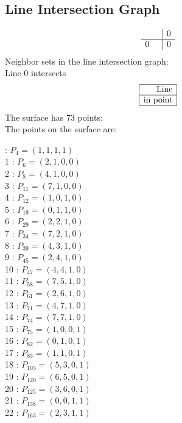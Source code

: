 \documentclass{article}
\begin{document}
{\subsection*{Line Intersection Graph}
{\arraycolsep=1pt
$$
\begin{array}{rr|*{1}r}
 &  & 0\\
\hline
0 &  & 0\\
\end{array}
$$
}%
Neighbor sets in the line intersection graph:\\
Line 0 intersects 
$$
\begin{array}{|r*{0}{|c}|}
\hline
\mbox{Line} \\
\hline
\mbox{in point} \\
\hline
\end{array}
$$
The surface has 73 points:\\
The points on the surface are:\\
\begin{multicols}{3}
 : $P_{4}=( 1, 1, 1, 1 )$\\
1 : $P_{6}=( 2, 1, 0, 0 )$\\
2 : $P_{8}=( 4, 1, 0, 0 )$\\
3 : $P_{11}=( 7, 1, 0, 0 )$\\
4 : $P_{12}=( 1, 0, 1, 0 )$\\
5 : $P_{19}=( 0, 1, 1, 0 )$\\
6 : $P_{29}=( 2, 2, 1, 0 )$\\
7 : $P_{34}=( 7, 2, 1, 0 )$\\
8 : $P_{39}=( 4, 3, 1, 0 )$\\
9 : $P_{45}=( 2, 4, 1, 0 )$\\
10 : $P_{47}=( 4, 4, 1, 0 )$\\
11 : $P_{58}=( 7, 5, 1, 0 )$\\
12 : $P_{61}=( 2, 6, 1, 0 )$\\
13 : $P_{71}=( 4, 7, 1, 0 )$\\
14 : $P_{74}=( 7, 7, 1, 0 )$\\
15 : $P_{75}=( 1, 0, 0, 1 )$\\
16 : $P_{82}=( 0, 1, 0, 1 )$\\
17 : $P_{83}=( 1, 1, 0, 1 )$\\
18 : $P_{103}=( 5, 3, 0, 1 )$\\
19 : $P_{120}=( 6, 5, 0, 1 )$\\
20 : $P_{125}=( 3, 6, 0, 1 )$\\
21 : $P_{138}=( 0, 0, 1, 1 )$\\
22 : $P_{163}=( 2, 3, 1, 1 )$\\

\end{multicols}}
\end{document}
